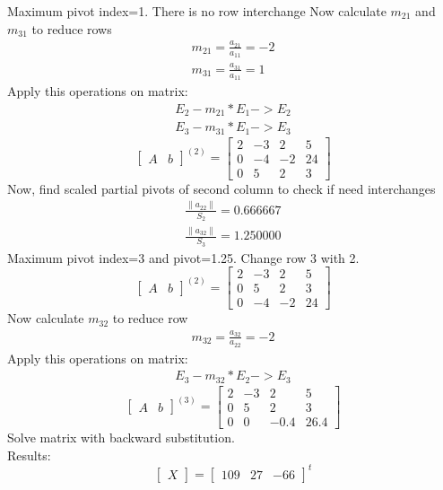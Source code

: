 \documentclass{article}
\begin{document}
Maximum pivot index=1. There is no row interchange
Now calculate $m_{21}$ and $m_{31}$ to reduce rows 
\begin{align}
	m_{21}=\frac{a_{21}}{a_{11}}=-2\\
	m_{31}=\frac{a_{31}}{a_{11}}=1
\end{align}
Apply this operations on matrix:
\begin{align}
	E_{2}-m_{21}*E_{1}->E_{2}\\
	E_{3}-m_{31}*E_{1}->E_{3}
\end{align}
\[
\left[
\begin{array}{c|c}
A&b
\end{array}
\right]^{(2)}
=
\left[
\begin{array}{ccc|c}
	2&-3&2&5\\
	0&-4&-2&24\\
	0&5&2&3 
\end{array}
\right]
\]
Now, find scaled partial pivots of second column to check if need interchanges
\begin{align}
	\frac{\|a_{22}\|}{S_{2}}=0.666667\\
	\frac{\|a_{32}\|}{S_{3}}=1.250000
\end{align}
Maximum pivot index=3 and pivot=1.25. Change row 3 with 2.
\[
\left[
\begin{array}{c|c}
A&b
\end{array}
\right]^{(2)}
=
\left[
\begin{array}{ccc|c}
	2&-3&2&5\\
	0&5&2&3\\
	0&-4&-2&24
\end{array}
\right]
\]
Now calculate $m_{32}$ to reduce row 
\begin{align}
	m_{32}=\frac{a_{32}}{a_{22}}=-2
\end{align}
Apply this operations on matrix:
\begin{align}
	E_{3}-m_{32}*E_{2}->E_{3}
\end{align}
\[
\left[
\begin{array}{c|c}
A&b
\end{array}
\right]^{(3)}
=
\left[
\begin{array}{ccc|c}
	2&-3&2&5\\
	0&5&2&3\\
	0&0&-0.4&26.4 
\end{array}
\right]
\]
Solve matrix with backward substitution.\\
Results:
\[
\begin{bmatrix}
X
\end{bmatrix}
=
\begin{bmatrix}
	109&27&-66
\end{bmatrix}^t
\]
\end{document}
